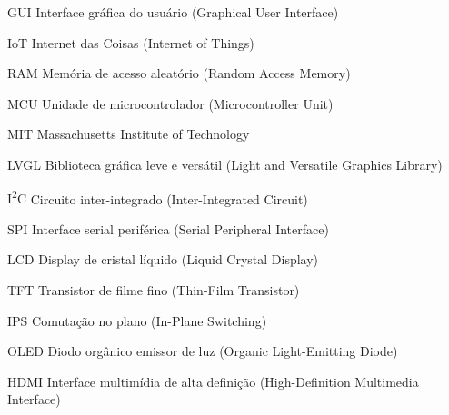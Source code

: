 \begin{siglas}
    \item[GUI] Interface gráfica do usuário (Graphical User Interface)
    \item[IoT] Internet das Coisas (Internet of Things)
    \item[RAM] Memória de acesso aleatório (Random Access Memory)
    \item[MCU] Unidade de microcontrolador (Microcontroller Unit)
    \item[MIT] Massachusetts Institute of Technology
    \item[LVGL] Biblioteca gráfica leve e versátil (Light and Versatile Graphics Library)
    \item[I\textsuperscript{2}C] Circuito inter-integrado (Inter-Integrated Circuit)
    \item[SPI] Interface serial periférica (Serial Peripheral Interface)
    \item[LCD] Display de cristal líquido (Liquid Crystal Display)
    \item[TFT] Transistor de filme fino (Thin-Film Transistor)
    \item[IPS] Comutação no plano (In-Plane Switching)
    \item[OLED] Diodo orgânico emissor de luz (Organic Light-Emitting Diode)
    \item[HDMI] Interface multimídia de alta definição (High-Definition Multimedia Interface)
\end{siglas}
